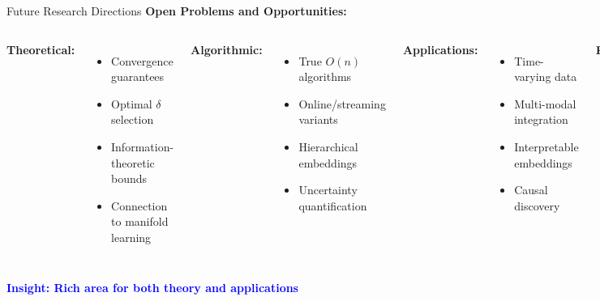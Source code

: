 \documentclass[aspectratio=169]{beamer}
\newcommand{\conceptbox}[2]{\colorbox{#1!20}{\textcolor{#1}{\textbf{#2}}}}
\newcommand{\insight}[1]{\conceptbox{blue}{Insight: #1}}
\begin{document}
\begin{frame}{Future Research Directions}
\textbf{Open Problems and Opportunities:}

\begin{columns}
\textbf{Theoretical:}
\begin{itemize}
\item Convergence guarantees
\item Optimal $\delta$ selection
\item Information-theoretic bounds
\item Connection to manifold learning
\end{itemize}

\textbf{Algorithmic:}
\begin{itemize}
\item True $O(n)$ algorithms
\item Online/streaming variants
\item Hierarchical embeddings
\item Uncertainty quantification
\end{itemize}

\textbf{Applications:}
\begin{itemize}
\item Time-varying data
\item Multi-modal integration
\item Interpretable embeddings
\item Causal discovery
\end{itemize}

\textbf{Extensions:}
\begin{itemize}
\item Higher-dimensional targets
\item Non-Euclidean spaces
\item Quantum t-SNE
\item Differentiable t-SNE
\end{itemize}
\end{columns}

\insight{Rich area for both theory and applications}
\end{frame}
\end{document}
